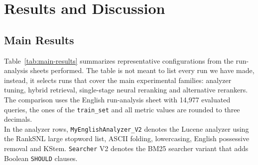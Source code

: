 \section{Results and Discussion}
\label{sec:results}

\subsection{Main Results}
Table~\ref{tab:main-results} summarizes representative configurations from the run-analysis sheets performed. The table is not meant to list every run we have made, instead, it selects runs that cover the main experimental families: analyzer tuning, hybrid retrieval, single-stage neural reranking and alternative rerankers. The comparison uses the English run-analysis sheet with 14,977 evaluated queries, the ones of the \texttt{train\_set} and all metric values are rounded to three decimals.\\
In the analyzer rows, \texttt{MyEnglishAnalyzer\_V2} denotes the Lucene analyzer using the RankSNL large stopword list, ASCII folding, lowercasing, English possessive removal and KStem. \texttt{Searcher} V2 denotes the BM25 searcher variant that adds Boolean \texttt{SHOULD} clauses.

